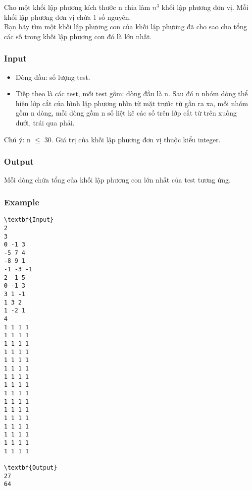 

Cho một khối lập phương kích thước n chia làm $n^{3}$ khối lập phương đơn vị. Mỗi khối lập phương đơn vị chứa 1 số nguyên.
\\Bạn hãy tìm một khối lập phương con của khối lập phương đã cho sao cho tổng các số trong khối lập phương con đó là lớn nhất.

\subsubsection{Input}
\begin{itemize}
	\item Dòng đầu: số lượng test.
	\item Tiếp theo là các test, mỗi test gồm: dòng đầu là n. Sau đó n nhóm dòng thể hiện lớp cắt của hình lập phương nhìn từ mặt trước từ gần ra xa, mỗi nhóm gồm n dòng, mỗi dòng gồm n số liệt kê các số trên lớp cắt từ trên xuống dưới, trái qua phải.
\end{itemize}

Chú ý: n  $\le$  30. Giá trị của khối lập phương đơn vị thuộc kiểu integer.

\subsubsection{Output}

Mỗi dòng chứa tổng của khối lập phương con lớn nhất của test tương ứng.

\subsubsection{Example}
\begin{verbatim}
\textbf{Input}
2
3
0 -1 3
-5 7 4
-8 9 1
-1 -3 -1
2 -1 5
0 -1 3
3 1 -1
1 3 2
1 -2 1
4
1 1 1 1
1 1 1 1
1 1 1 1
1 1 1 1
1 1 1 1
1 1 1 1
1 1 1 1
1 1 1 1
1 1 1 1
1 1 1 1
1 1 1 1
1 1 1 1
1 1 1 1
1 1 1 1
1 1 1 1
1 1 1 1

\textbf{Output}
27
64
\end{verbatim}
